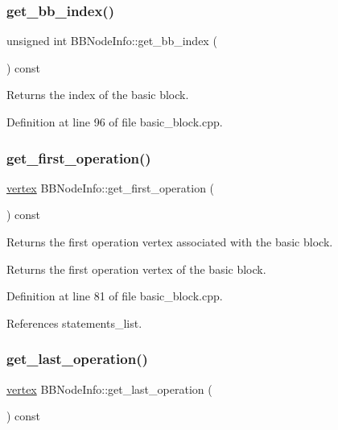 \subsubsection{\texorpdfstring{get\+\_\+bb\+\_\+index()}{get\_bb\_index()}}
{\footnotesize\ttfamily unsigned int B\+B\+Node\+Info\+::get\+\_\+bb\+\_\+index (\begin{DoxyParamCaption}{ }\end{DoxyParamCaption}) const}



Returns the index of the basic block. 



Definition at line 96 of file basic\+\_\+block.\+cpp.

\mbox{\label{structBBNodeInfo_ad6f05340841980bf4e373f226f82be23}} 
\subsubsection{\texorpdfstring{get\+\_\+first\+\_\+operation()}{get\_first\_operation()}}
{\footnotesize\ttfamily \hyperlink{graph_8hpp_abefdcf0544e601805af44eca032cca14}{vertex} B\+B\+Node\+Info\+::get\+\_\+first\+\_\+operation (\begin{DoxyParamCaption}{ }\end{DoxyParamCaption}) const}



Returns the first operation vertex associated with the basic block. 

\begin{DoxyReturn}{Returns}
the first operation vertex of the basic block. 
\end{DoxyReturn}


Definition at line 81 of file basic\+\_\+block.\+cpp.



References statements\+\_\+list.

\mbox{\label{structBBNodeInfo_a4a5d501afc8153738187ea681a0d14ad}} 
\subsubsection{\texorpdfstring{get\+\_\+last\+\_\+operation()}{get\_last\_operation()}}
{\footnotesize\ttfamily \hyperlink{graph_8hpp_abefdcf0544e601805af44eca032cca14}{vertex} B\+B\+Node\+Info\+::get\+\_\+last\+\_\+operation (\begin{DoxyParamCaption}{ }\end{DoxyParamCaption}) const}



